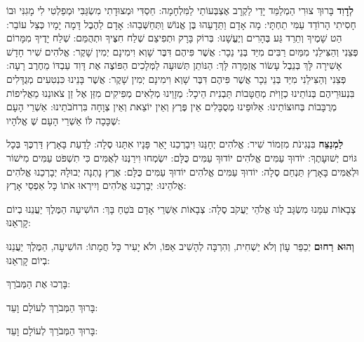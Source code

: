 
\label{arvit}

\textbf{לְדָוִד} בָּרוּךְ \Shem{} צוּרִי הַמְלַמֵּד יָדַי לַקְרָב אֶצְבְּעוֹתַי לַמִּלְחָמָה: חַסְדִּי וּמְצוּדָתִי מִשְׂגַּבִּי וּמְפַלְטִי לִי מָגִנִּי וּבוֹ חָסִיתִי הָרוֹדֵד עַמִּי תַחְתָּי: \Shem{} מָה אָדָם וַתֵּדָעֵהוּ בֶּן אֱנוֹשׁ וַתְּחַשְּׁבֵהוּ: אָדָם לַהֶבֶל דָּמָה יָמָיו כְּצֵל עוֹבֵר: \Shem{} הַט שָׁמֶיךָ וְתֵרֵד גַּע בֶּהָרִים וְיֶעֱשָׁנוּ: בְּרוֹק בָּרָק וּתְפִיצֵם שְׁלַח חִצֶּיךָ וּתְהֻמֵּם: שְׁלַח יָדֶיךָ מִמָּרוֹם פְּצֵנִי וְהַצִּילֵנִי מִמַּיִם רַבִּים מִיַּד בְּנֵי נֵכָר: אֲשֶׁר פִּיהֶם דִּבֶּר שָׁוְא וִימִינָם יְמִין שָׁקֶר: אֱלֹהִים שִׁיר חָדָשׁ אָשִׁירָה לָּךְ בְּנֵבֶל עָשׂוֹר אֲזַמְּרָה לָּךְ: הַנּוֹתֵן תְּשׁוּעָה לַמְּלָכִים הַפּוֹצֶה אֶת דָּוִד עַבְדּוֹ מֵחֶרֶב רָעָה: פְּצֵנִי וְהַצִּילֵנִי מִיַּד בְּנֵי נֵכָר אֲשֶׁר פִּיהֶם דִּבֶּר שָׁוְא וִימִינָם יְמִין שָׁקֶר: אֲשֶׁר בָּנֵינוּ כִּנְטִעִים מְגֻדָּלִים בִּנְעוּרֵיהֶם בְּנוֹתֵינוּ כְזָוִיֹּת מְחֻטָּבוֹת תַּבְנִית הֵיכָל: מְזָוֵינוּ מְלֵאִים מְפִיקִים מִזַּן אֶל זַן צֹאונֵנוּ מַאֲלִיפוֹת מְרֻבָּבוֹת בְּחוּצוֹתֵינוּ: אַלּוּפֵינוּ מְסֻבָּלִים אֵין פֶּרֶץ וְאֵין יוֹצֵאת וְאֵין צְוָחָה בִּרְחֹבֹתֵינוּ: אַשְׁרֵי הָעָם שֶׁכָּכָה לּוֹ אַשְׁרֵי הָעָם שֶׁ\Shem{} אֱלֹהָיו:

\textbf{לַמְנַצֵּח} בִּנְגִינֹת מִזְמוֹר שִׁיר: אֱלֹהִים יְחָנֵּנוּ וִיבָרְכֵנוּ יָאֵר פָּנָיו אִתָּנוּ סֶלָה: לָדַעַת בָּאָרֶץ דַּרְכֶּךָ בְּכָל גּוֹיִם יְשׁוּעָתֶךָ: יוֹדוּךָ עַמִּים אֱלֹהִים יוֹדוּךָ עַמִּים כֻּלָּם: יִשְׂמְחוּ וִירַנְּנוּ לְאֻמִּים כִּי תִשְׁפֹּט עַמִּים מִישׁוֹר וּלְאֻמִּים בָּאָרֶץ תַּנְחֵם סֶלָה: יוֹדוּךָ עַמִּים אֱלֹהִים יוֹדוּךָ עַמִּים כֻּלָּם: אֶרֶץ נָתְנָה יְבוּלָהּ יְבָרְכֵנוּ אֱלֹהִים אֱלֹהֵינוּ: יְבָרְכֵנוּ אֱלֹהִים וְיִירְאוּ אֹתוֹ כָּל אַפְסֵי אָרֶץ:

\textbf{\Shem{}} צְבָאוֹת עִמָּנוּ מִשְׂגָּב לָנוּ אֱלֹהֵי יַעֲקֹב סֶלָה: \Shem{} צְבָאוֹת אַשְׁרֵי אָדָם בֹּטֵחַ בָּךְ: \Shem{} הוֹשִׁיעָה הַמֶּלֶךְ יַעֲנֵנוּ בְיוֹם קָרְאֵנוּ:



\textbf{וְהוּא רַחוּם} יְכַפֵּר עָוֹן וְלֹא יַשְׁחִית, וְהִרְבָּה לְהָשִׁיב אַפּוֹ, ולֹא יָעִיר כָּל חֲמָתוֹ: \Shem{} הוֹשִׁיעָה, הַמֶּלֶךְ יַעֲנֵנוּ בְיוֹם קָרְאֵנוּ:

בָּרְכוּ אֶת \Shem{} הַמְּבֹרַךְ:

בָּרוּךְ \Shem{} הַמְּבֹרַךְ לְעוֹלָם וָעֵד:

בָּרוּךְ \Shem{} הַמְּבֹרַךְ לְעוֹלָם וָעֵד:
